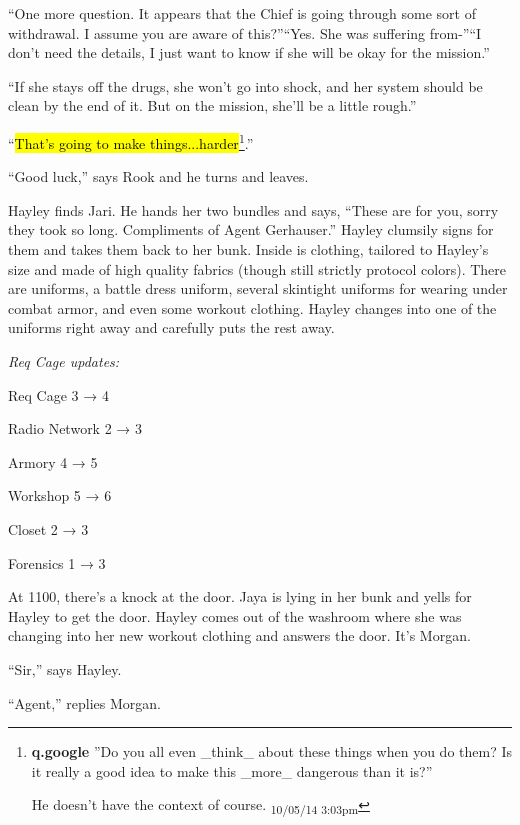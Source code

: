``One more question.  It appears that the Chief is going through some sort of withdrawal.  I assume you are aware of this?''``Yes. She was suffering from-''``I don't need the details, I just want to know if she will be okay for the mission.''

``If she stays off the drugs, she won't go into shock, and her system should be clean by the end of it.  But on the mission, she'll be a little rough.''

``\hl{That's going to make things...harder}\footnote{\textbf{q.google }''Do you all even \_think\_ about these things when you do them?  Is it really a good idea to make this \_more\_ dangerous than it is?''

He doesn't have the context of course. \textsubscript{10/05/14 3:03pm}}.''

``Good luck,'' says Rook and he turns and leaves.





Hayley finds Jari.  He hands her two bundles and says, ``These are for you, sorry they took so long.  Compliments of Agent Gerhauser.''  Hayley clumsily signs for them and takes them back to her bunk.  Inside is clothing, tailored to Hayley's size and made of high quality fabrics (though still strictly protocol colors).  There are uniforms, a battle dress uniform, several skintight uniforms for wearing under combat armor, and even some workout clothing.  Hayley changes into one of the uniforms right away and carefully puts the rest away.



\textit{Req Cage updates:}

Req Cage 3 → 4

Radio Network 2 →  3

Armory 4 →  5

Workshop 5 →  6

Closet 2 →  3

Forensics 1 →  3





At 1100, there's a knock at the door.  Jaya is lying in her bunk and yells for Hayley to get the door.  Hayley comes out of the washroom where she was changing into her new workout clothing and answers the door.  It's Morgan.

``Sir,'' says Hayley.

``Agent,'' replies Morgan.

